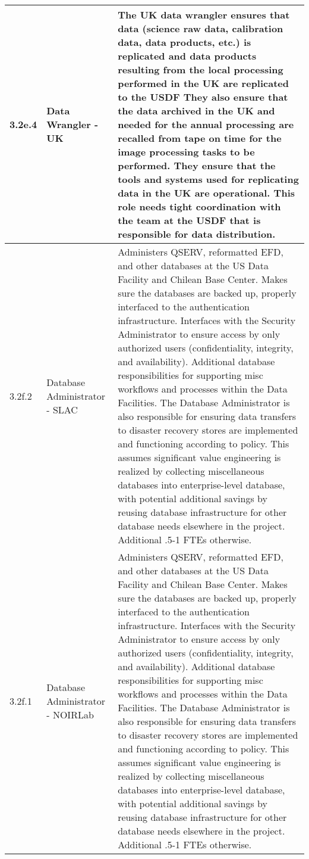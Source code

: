 \begin{longtable} {|p{}|p{}|p{}|}
{3.2e.4}&{Data Wrangler - UK}&{The UK data wrangler ensures that data (science raw data, calibration data, data products, etc.) is replicated and data products resulting from the local processing performed in the UK are replicated to the USDF They also ensure that the data archived in the UK and needed for the annual processing are recalled from tape on time for the image processing tasks to be performed. They ensure that the tools and systems used for replicating data in the UK are operational. This role needs tight coordination with the team at the USDF that is responsible for data distribution.} \\ \hline
{3.2f.2}&{Database Administrator - SLAC}&{Administers QSERV, reformatted EFD, and other databases at the US Data Facility and Chilean Base Center. Makes sure the databases are backed up, properly interfaced to the authentication infrastructure. Interfaces with the Security Administrator to ensure access by only authorized users (confidentiality, integrity, and availability). Additional database responsibilities for supporting misc workflows and processes within the Data Facilities. The Database Administrator is also responsible for ensuring data transfers to disaster recovery stores are implemented and functioning according to policy. This assumes significant value engineering is realized by collecting miscellaneous databases into enterprise-level database, with potential additional savings by reusing database infrastructure for other database needs elsewhere in the project. Additional .5-1 FTEs otherwise.} \\ \hline
{3.2f.1}&{Database Administrator - NOIRLab}&{Administers QSERV, reformatted EFD, and other databases at the US Data Facility and Chilean Base Center. Makes sure the databases are backed up, properly interfaced to the authentication infrastructure. Interfaces with the Security Administrator to ensure access by only authorized users (confidentiality, integrity, and availability). Additional database responsibilities for supporting misc workflows and processes within the Data Facilities. The Database Administrator is also responsible for ensuring data transfers to disaster recovery stores are implemented and functioning according to policy. This assumes significant value engineering is realized by collecting miscellaneous databases into enterprise-level database, with potential additional savings by reusing database infrastructure for other database needs elsewhere in the project. Additional .5-1 FTEs otherwise.} \\ \hline

\end{longtable}
